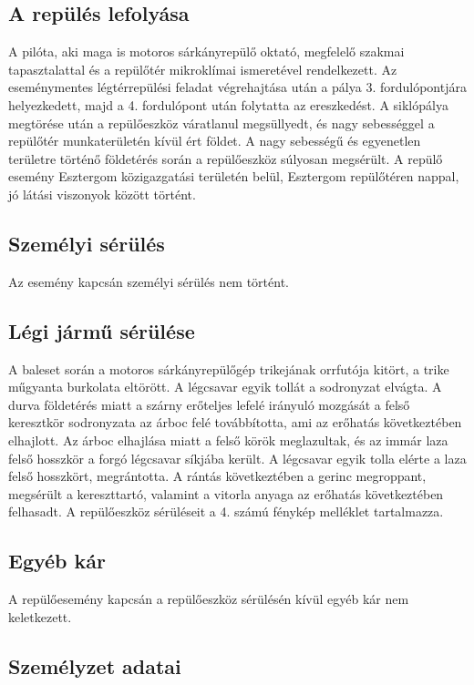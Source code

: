 \documentclass[a4paper,10pt]{article}
\begin{document}
\subsection{A repülés lefolyása}
A pilóta, aki maga is motoros sárkányrepülő oktató, megfelelő szakmai 
tapasztalattal és a repülőtér mikroklímai ismeretével rendelkezett. Az 
eseménymentes légtérrepülési feladat végrehajtása után a pálya 3. 
fordulópontjára helyezkedett, majd a 4. fordulópont után folytatta az 
ereszkedést. A siklópálya megtörése után a repülőeszköz váratlanul 
megsüllyedt, és nagy sebességgel a repülőtér munkaterületén kívül ért
földet. A nagy sebességű és egyenetlen területre történő földetérés során a 
repülőeszköz súlyosan megsérült. A repülő esemény Esztergom közigazgatási 
területén belül, Esztergom repülőtéren nappal, jó látási viszonyok között 
történt.

\subsection{Személyi sérülés}
Az esemény kapcsán személyi sérülés nem történt.

\subsection{Légi jármű sérülése}
A baleset során a motoros sárkányrepülőgép trikejának orrfutója kitört, a 
trike műgyanta burkolata eltörött. A légcsavar egyik tollát a sodronyzat 
elvágta. A durva földetérés miatt a szárny erőteljes lefelé irányuló
mozgását a felső keresztkör sodronyzata az árboc felé továbbította, ami az 
erőhatás következtében elhajlott.
Az árboc elhajlása miatt a felső körök meglazultak, és az 
immár laza felső hosszkör a forgó légcsavar síkjába került. A légcsavar
egyik tolla elérte a laza felső hosszkört, megrántotta. A rántás
következtében a gerinc megroppant, megsérült a kereszttartó, valamint a
vitorla anyaga az erőhatás következtében felhasadt.
A repülőeszköz sérüléseit a 4. számú fénykép melléklet tartalmazza.

\subsection{Egyéb kár}
A repülőesemény kapcsán a repülőeszköz sérülésén kívül egyéb kár nem 
keletkezett.

\subsection{Személyzet adatai}
\end{document}
